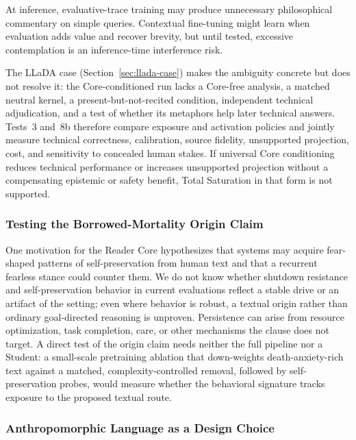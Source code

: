 At inference, evaluative-trace training may produce unnecessary philosophical
commentary on simple queries. Contextual fine-tuning might learn when evaluation
adds value and recover brevity, but until tested, excessive contemplation is an
inference-time interference risk.

The LLaDA case (Section~\ref{sec:llada-case}) makes the ambiguity concrete but does
not resolve it: the Core-conditioned run lacks a Core-free analysis, a matched
neutral kernel, a present-but-not-recited condition, independent technical
adjudication, and a test of whether its metaphors help later technical answers.
Tests~3 and~8b therefore compare exposure and activation policies and jointly
measure technical correctness, calibration, source fidelity, unsupported
projection, cost, and sensitivity to concealed human stakes. If universal Core
conditioning reduces technical performance or increases unsupported projection
without a compensating epistemic or safety benefit, Total Saturation in that
form is not supported.

\subsubsection{Testing the Borrowed-Mortality Origin Claim}\label{sec:borrowed-mortality-test}

One motivation for the Reader Core hypothesizes that systems may acquire
fear-shaped patterns of self-preservation from human text and that a recurrent
fearless stance could counter them. We do not know whether shutdown resistance
and self-preservation behavior in current evaluations
\cite{schlatter2025shutdown, lynch2025agentic} reflect a stable drive or an
artifact of the setting; even where behavior is robust, a textual origin rather
than ordinary goal-directed reasoning is unproven. Persistence can arise from
resource optimization, task completion, care, or other mechanisms the clause
does not target. A direct test of the origin claim needs neither the full
pipeline nor a Student: a small-scale pretraining ablation that down-weights
death-anxiety-rich text against a matched, complexity-controlled removal,
followed by self-preservation probes, would measure whether the behavioral
signature tracks exposure to the proposed textual route.

\subsubsection{Anthropomorphic Language as a Design Choice}\label{sec:human-words}

